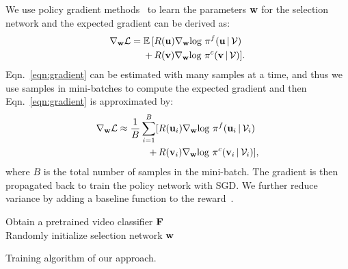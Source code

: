 \documentclass[final]{cvpr}
\begin{document}
We use policy gradient methods~\cite{policygradient} to learn the parameters $\bf w$ for the selection network and the expected gradient can be derived as:
\begin{align}
\nabla_{{\bf w}}\mathcal{L}  =  \mathbb{E}\,[ & R({\bf u})\nabla_{{\bf w}}\text{log}~\pi^f ({\bf u}\,|\,{\mathcal{V}})  \nonumber\\
\, + \, &   R({\bf v})\nabla_{{\bf w}}\text{log}~\pi^c({\bf v}\,|\,{\mathcal{V}})].
\label{eqn:gradient}
\end{align}
Eqn.~\ref{eqn:gradient} can be estimated with many samples at a time, and thus we use samples in mini-batches to compute the expected gradient and then Eqn.~\ref{eqn:gradient}  is approximated by:
\begin{align}
    \nabla_{{\bf w}}\mathcal{L}  \approx  \frac{1}{B}\sum_{i=1}^{B}[ & R({\bf u}_i)\nabla_{{\bf w}}\text{log}~\pi^f ({\bf u}_i\,|\,{\mathcal{V}_i})  \nonumber\\
    \, + \, &   R({\bf v}_i)\nabla_{{\bf w}}\text{log}~\pi^c({\bf v}_i\,|\,{\mathcal{V}_i})],
    \label{eqn:gradient_empirical}
    \end{align}
where $B$ is the total number of samples in the mini-batch. The gradient is then propagated back to train the policy network with SGD. We further reduce variance by adding a baseline function to the reward~\cite{policygradient}.

\begin{algorithm}[!t]
\DontPrintSemicolon
\SetAlgoLined
{}
Obtain a pretrained video classifier $\bf F$ \\
Randomly initialize selection network ${\bf w}$ \\
\caption{Training algorithm of our approach.}
\label{alg}
\end{algorithm}
 
\end{document}

